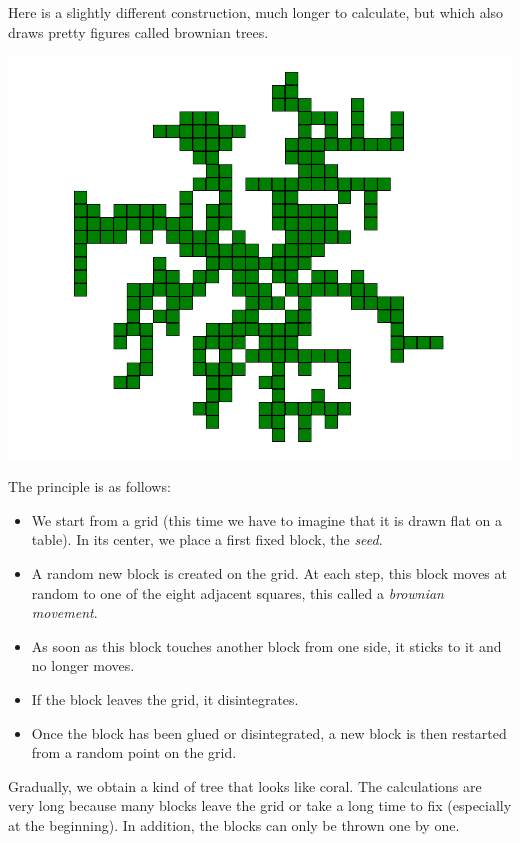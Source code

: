 \documentclass[11pt,class=report,crop=false]{standalone}
\begin{document}
\begin{cours}

Here is a slightly different construction, much longer to calculate, but which also draws pretty figures called \og{}brownian trees\fg{}.

\begin{center}
\includegraphics[scale=\myscale,scale=0.28]{screen-blocks-tree1}
\end{center}


The principle is as follows:
\begin{itemize}
  \item We start from a grid (this time we have to imagine that it is drawn flat on a table). In its center, we place a first fixed block, the \emph{seed}.
  
  \item A random new block is created on the grid. At each step, this block moves at random to one of the eight adjacent squares, this called a \emph{brownian movement}. 

  \item As soon as this block touches another block from one side, it sticks to it and no longer moves.

  \item If the block leaves the grid, it disintegrates.
  
  \item Once the block has been glued or disintegrated, a new block is then restarted from a random point on the grid.
\end{itemize}



Gradually, we obtain a kind of tree that looks like coral. The calculations are very long because many blocks leave the grid or take a long time to fix (especially at the beginning). In addition, the blocks can only be thrown one by one.

\end{cours}
\end{document}
